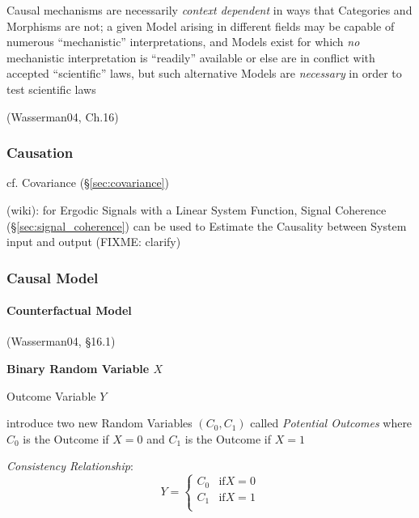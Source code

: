 Causal mechanisms are necessarily \emph{context dependent} in ways that
Categories and Morphisms are not;
a given Model arising in different fields may be capable of numerous
``mechanistic'' interpretations, and Models exist for which \emph{no}
mechanistic interpretation is ``readily'' available or else are in conflict
with accepted ``scientific'' laws, but such alternative Models are
\emph{necessary} in order to test scientific laws

(Wasserman04, Ch.16)



\subsubsection{Causation}\label{sec:causation}


cf. Covariance (\S\ref{sec:covariance})

\fist (wiki): for Ergodic Signals with a Linear System Function, Signal
Coherence (\S\ref{sec:signal_coherence}) can be used to Estimate the Causality
between System input and output (FIXME: clarify)



\subsubsection{Causal Model}\label{sec:causal_model}




\paragraph{Counterfactual Model}\label{sec:counterfactual}\hfill

(Wasserman04, \S16.1)

\textbf{Binary Random Variable $X$}

Outcome Variable $Y$

introduce two new Random Variables $(C_0, C_1)$ called \emph{Potential Outcomes}
where $C_0$ is the Outcome if $X = 0$ and $C_1$ is the Outcome if $X = 1$

\emph{Consistency Relationship}:
\[
  Y = \begin{cases}
    C_0 & \text{if} X = 0 \\
    C_1 & \text{if} X = 1 \\
  \end{cases}
\]

